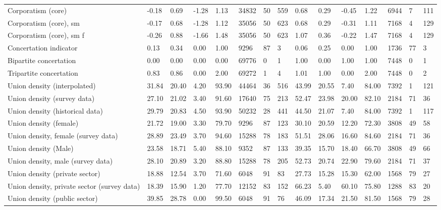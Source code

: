 \begin{longtable}{lllllllllllllll}
Corporatism (core) & -0.18 & 0.69 & -1.28 & 1.13 & 34832 & 50 & 559 & 0.68 & 0.29 & -0.45 & 1.22 & 6944 & 7 & 111\\
\addlinespace
Corporatism (core), sm & -0.17 & 0.68 & -1.28 & 1.12 & 35056 & 50 & 623 & 0.68 & 0.29 & -0.31 & 1.11 & 7168 & 4 & 129\\
Corporatism (core), sm f & -0.26 & 0.88 & -1.66 & 1.48 & 35056 & 50 & 623 & 1.07 & 0.36 & -0.22 & 1.47 & 7168 & 4 & 129\\
Concertation indicator & 0.13 & 0.34 & 0.00 & 1.00 & 9296 & 87 & 3 & 0.06 & 0.25 & 0.00 & 1.00 & 1736 & 77 & 3\\
Bipartite concertation & 0.00 & 0.00 & 0.00 & 0.00 & 69776 & 0 & 1 & 1.00 & 0.00 & 1.00 & 1.00 & 7448 & 0 & 1\\
Tripartite concertation & 0.83 & 0.86 & 0.00 & 2.00 & 69272 & 1 & 4 & 1.01 & 1.00 & 0.00 & 2.00 & 7448 & 0 & 2\\
\addlinespace
Union density (interpolated) & 31.84 & 20.40 & 4.20 & 93.90 & 44464 & 36 & 516 & 43.99 & 20.55 & 7.40 & 84.00 & 7392 & 1 & 121\\
Union density (survey data) & 27.10 & 21.02 & 3.40 & 91.60 & 17640 & 75 & 213 & 52.47 & 23.98 & 20.00 & 82.10 & 2184 & 71 & 36\\
Union density (historical data) & 29.79 & 20.83 & 4.50 & 93.90 & 50232 & 28 & 441 & 44.50 & 21.07 & 7.40 & 84.00 & 7392 & 1 & 117\\
Union density (female) & 21.72 & 19.00 & 3.30 & 79.70 & 9296 & 87 & 123 & 30.10 & 20.59 & 12.20 & 72.30 & 3808 & 49 & 58\\
Union density, female (survey data) & 28.89 & 23.49 & 3.70 & 94.60 & 15288 & 78 & 183 & 51.51 & 28.06 & 16.60 & 84.60 & 2184 & 71 & 36\\
\addlinespace
Union density (Male) & 23.58 & 18.71 & 5.40 & 88.10 & 9352 & 87 & 133 & 39.35 & 15.70 & 18.40 & 66.70 & 3808 & 49 & 66\\
Union density, male (survey data) & 28.10 & 20.89 & 3.20 & 88.80 & 15288 & 78 & 205 & 52.73 & 20.74 & 22.90 & 79.60 & 2184 & 71 & 37\\
Union density (private sector) & 18.88 & 12.54 & 3.70 & 71.60 & 6048 & 91 & 83 & 27.73 & 15.28 & 15.30 & 62.00 & 1568 & 79 & 27\\
Union density, private sector (survey data) & 18.39 & 15.90 & 1.20 & 77.70 & 12152 & 83 & 152 & 66.23 & 5.40 & 60.10 & 75.80 & 1288 & 83 & 20\\
Union density (public sector) & 39.85 & 28.78 & 0.00 & 99.50 & 6048 & 91 & 76 & 46.09 & 17.34 & 21.50 & 81.50 & 1568 & 79 & 28\\

\end{longtable}

